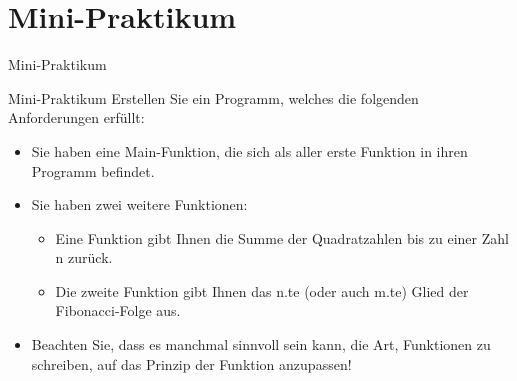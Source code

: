 \documentclass[usenames,dvipsnames,10pt]{beamer}
\begin{document}
    \section{Mini-Praktikum}
    \begin{frame}{Mini-Praktikum}
        \begin{exampleblock}{Mini-Praktikum}
            Erstellen Sie ein Programm, welches die folgenden Anforderungen erfüllt:
            \begin{itemize}
                \item Sie haben eine Main-Funktion, die sich als aller erste Funktion in ihren Programm befindet.
                \item Sie haben zwei weitere Funktionen:
                \begin{itemize}
                    \item Eine Funktion gibt Ihnen die Summe der Quadratzahlen bis zu einer Zahl n zurück.
                    \item Die zweite Funktion gibt Ihnen das n.te (oder auch m.te) Glied der Fibonacci-Folge aus.
                \end{itemize}
                \item Beachten Sie, dass es manchmal sinnvoll sein kann, die Art, Funktionen zu schreiben, auf das Prinzip der Funktion anzupassen!
            \end{itemize}
        \end{exampleblock}
    \end{frame}
    
\end{document}
